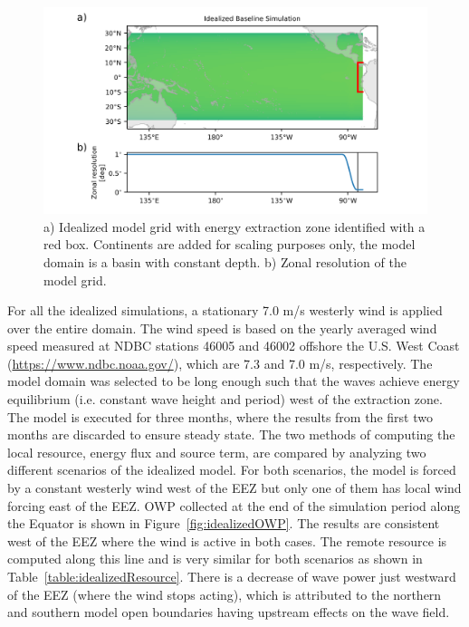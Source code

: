 \begin{figure}[ht]
  \includegraphics[width=6in]{../diagram/appendixB_Figure1.png}
  \caption{a) Idealized model grid with energy extraction zone identified with a red box. Continents are added for scaling purposes only, the model domain is a basin with constant depth. b) Zonal resolution of the model grid.}
  \label{fig:idealizedDomain}
\end{figure}

For all the idealized simulations, a stationary 7.0 m/s westerly wind is applied over the entire domain. The wind speed is based on the yearly averaged wind speed measured at NDBC stations 46005 and 46002 offshore the U.S. West Coast (\url{https://www.ndbc.noaa.gov/}), which are 7.3 and 7.0 m/s, respectively. The model domain was selected to be long enough such that the waves achieve energy equilibrium (i.e. constant wave height and period) west of the extraction zone. The model is executed for three months, where the results from the first two months are discarded to ensure steady state. The two methods of computing the local resource, energy flux and source term, are compared by analyzing two different scenarios of the idealized model. For both scenarios, the model is forced by a constant westerly wind west of the EEZ but only one of them has local wind forcing east of the EEZ. OWP collected at the end of the simulation period along the Equator is shown in Figure~\ref{fig:idealizedOWP}. The results are consistent west of the EEZ where the wind is active in both cases. The remote resource is computed along this line and is very similar for both scenarios as shown in Table~\ref{table:idealizedResource}. There is a decrease of wave power just westward of the EEZ (where the wind stops acting), which is attributed to the northern and southern model open boundaries having upstream effects on the wave field.

